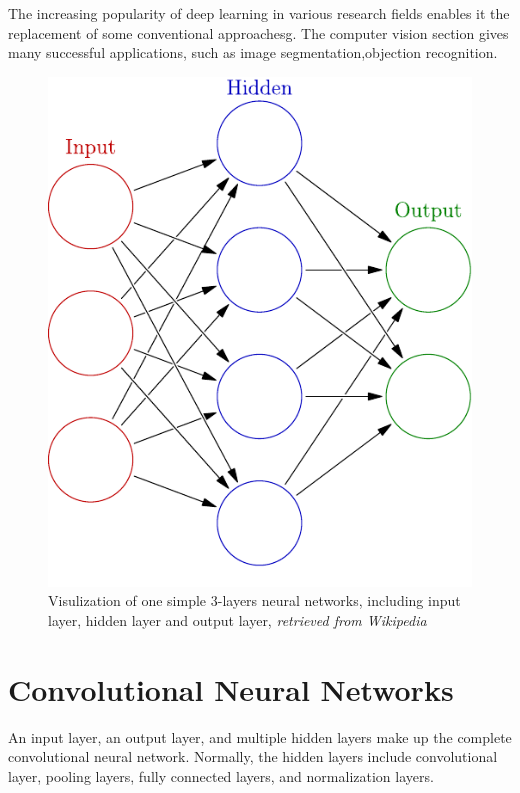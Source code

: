     The increasing popularity of deep learning in various research fields enables it the replacement of some conventional approachesg. The computer vision section gives many successful applications, such as image segmentation\cite{lecun2015deep},objection recognition\cite{he2016deep}.
     \begin{figure}[!ht]
        \centering
        \includegraphics[scale = 0.5]{Figures/Colored_neural_network}
        \caption{Visulization of one simple $3$-layers neural networks, including input layer, hidden layer and output layer, \textit{retrieved from Wikipedia}}
    \end{figure}

\section{Convolutional Neural Networks}
    \label{cnn}
    An input layer, an output layer, and multiple hidden layers make up the complete convolutional neural network. Normally, the hidden layers include convolutional layer, pooling layers, fully connected layers, and normalization layers. 

